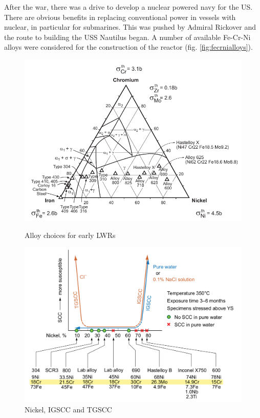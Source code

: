 After the war, there was a drive to develop a nuclear powered navy for the US.  There are obvious benefits in replacing conventional power in vessels with nuclear, in particular for submarines.  This was pushed by Admiral Rickover and the route to building the USS Nautilus began.  A number of available Fe-Cr-Ni alloys were considered for the construction of the reactor (fig. \ref{fig:fecrnialloys}).

\begin{figure}
\centering
\begin{minipage}{.46\textwidth}
\centering
    \includegraphics[width=.8\linewidth]{chapters/background_austenitic_steels_in_nuclear/images/fecrnialloys.png}
    \caption{Alloy choices for early LWRs}
    \label{fig:fecrnialloys}
\end{minipage}
\begin{minipage}{.05\textwidth}
\end{minipage}
\begin{minipage}{.46\textwidth}
\centering
    \includegraphics[width=.8\linewidth]{chapters/background_austenitic_steels_in_nuclear/images/tgscc_igscc_vs_nickel.png}
    \caption{Nickel, IGSCC and TGSCC}
    \label{fig:nitgsccigscc}
\end{minipage}
\end{figure}

